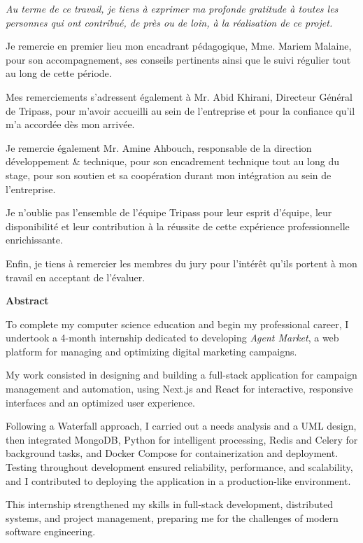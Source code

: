 \documentclass[12pt,a4paper]{report}
\numberwithin{figure}{chapter}
\numberwithin{table}{chapter}
\newcommand{\centeredgreentitle}[1]{%
  \vspace*{0.8cm}%
  \begin{center}
    {\fontsize{24}{28}\selectfont\bfseries\color{titlegreen} #1}
  \end{center}
  \vspace{0.5cm}
}
\newcommand{\addfrontmattertotoc}[1]{\addcontentsline{toc}{chapter}{#1}}
\begin{document}
\begin{center}
\fontsize{16}{22}\selectfont\itshape
Au terme de ce travail, je tiens à exprimer ma profonde gratitude à toutes les personnes qui ont contribué, de près ou de loin, à la réalisation de ce projet.

Je remercie en premier lieu mon encadrant pédagogique, Mme. Mariem Malaine, pour son accompagnement, ses conseils pertinents ainsi que le suivi régulier tout au long de cette période.

Mes remerciements s’adressent également à Mr. Abid Khirani, Directeur Général de Tripass, pour m’avoir accueilli au sein de l’entreprise et pour la confiance qu’il m’a accordée dès mon arrivée.

Je remercie également Mr. Amine Ahbouch, responsable de la direction développement \& technique, pour son encadrement technique tout au long du stage, pour son soutien et sa coopération durant mon intégration au sein de l’entreprise.

Je n’oublie pas l’ensemble de l’équipe Tripass pour leur esprit d’équipe, leur disponibilité et leur contribution à la réussite de cette expérience professionnelle enrichissante.

Enfin, je tiens à remercier les membres du jury pour l’intérêt qu’ils portent à mon travail en acceptant de l’évaluer.
\end{center}

\newpage

\centeredgreentitle{Abstract}
\addfrontmattertotoc{Abstract}

\vspace{0.5cm}

{\fontsize{14}{20}\selectfont
To complete my computer science education and begin my professional career, I undertook a 4-month internship dedicated to developing \textit{Agent Market}, a web platform for managing and optimizing digital marketing campaigns.

My work consisted in designing and building a full-stack application for campaign management and automation, using Next.js and React for interactive, responsive interfaces and an optimized user experience.

Following a Waterfall approach, I carried out a needs analysis and a UML design, then integrated MongoDB, Python for intelligent processing, Redis and Celery for background tasks, and Docker Compose for containerization and deployment. Testing throughout development ensured reliability, performance, and scalability, and I contributed to deploying the application in a production-like environment.

This internship strengthened my skills in full-stack development, distributed systems, and project management, preparing me for the challenges of modern software engineering.
\par}
\end{document}
